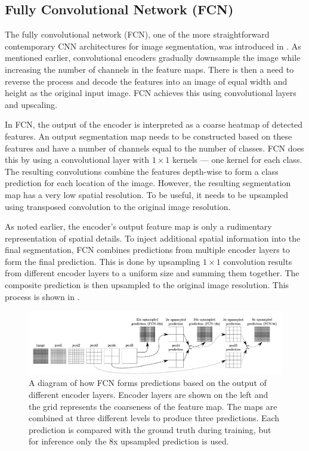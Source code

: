 \subsection{Fully Convolutional Network (FCN)}

The fully convolutional network (FCN), one of the more straightforward contemporary CNN architectures for image segmentation, was introduced in \cite{long2015fully}. As mentioned earlier, convolutional encoders gradually downsample the image while increasing the number of channels in the feature maps. There is then a need to reverse the process and decode the features into an image of equal width and height as the original input image. FCN achieves this using convolutional layers and upscaling.

In FCN, the output of the encoder is interpreted as a coarse heatmap of detected features. An output segmentation map needs to be constructed based on these features and have a number of channels equal to the number of classes. FCN does this by using a convolutional layer with $1 \times 1$ kernels --- one kernel for each class. The resulting convolutions combine the features depth-wise to form a class prediction for each location of the image. However, the resulting segmentation map has a very low spatial resolution. To be useful, it needs to be upsampled using transposed convolution to the original image resolution.

As noted earlier, the encoder's output feature map is only a rudimentary representation of spatial details. To inject additional spatial information into the final segmentation, FCN combines predictions from multiple encoder layers to form the final prediction. This is done by upsampling $1 \times 1$ convolution results from different encoder layers to a uniform size and summing them together. The composite prediction is then upsampled to the original image resolution. This process is shown in . 

\begin{figure}[t!]
 \centering
 \includegraphics[width=\linewidth]{images/fcn-arch}
 \caption{A diagram of how FCN forms predictions based on the output of different encoder layers. Encoder layers are shown on the left and the grid represents the coarseness of the feature map. The maps are combined at three different levels to produce three predictions. Each prediction is compared with the ground truth during training, but for inference only the 8x upsampled prediction is used. \cite{long2015fully}}
 \label{fig:fcn-arch}
 \end{figure}
 
